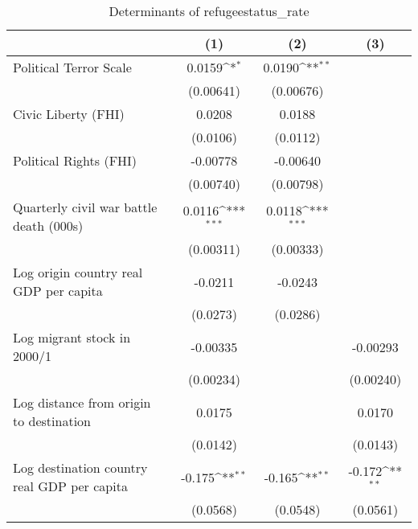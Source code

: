 \begin{table}[htbp]\centering
\def\sym#1{\ifmmode^{#1}\else\(^{#1}\)\fi}
\caption{Determinants of refugeestatus\_rate}
\begin{tabular}{l*{3}{c}}
\hline\hline
                    &\multicolumn{1}{c}{(1)}         &\multicolumn{1}{c}{(2)}         &\multicolumn{1}{c}{(3)}         \\
\hline
Political Terror Scale&      0.0159\sym{*}  &      0.0190\sym{**} &                     \\
                    &   (0.00641)         &   (0.00676)         &                     \\
[1em]
Civic Liberty (FHI) &      0.0208         &      0.0188         &                     \\
                    &    (0.0106)         &    (0.0112)         &                     \\
[1em]
Political Rights (FHI)&    -0.00778         &    -0.00640         &                     \\
                    &   (0.00740)         &   (0.00798)         &                     \\
[1em]
Quarterly civil war battle death (000s)&      0.0116\sym{***}&      0.0118\sym{***}&                     \\
                    &   (0.00311)         &   (0.00333)         &                     \\
[1em]
Log origin country real GDP per capita&     -0.0211         &     -0.0243         &                     \\
                    &    (0.0273)         &    (0.0286)         &                     \\
[1em]
Log migrant stock in 2000/1&    -0.00335         &                     &    -0.00293         \\
                    &   (0.00234)         &                     &   (0.00240)         \\
[1em]
Log distance from origin to destination&      0.0175         &                     &      0.0170         \\
                    &    (0.0142)         &                     &    (0.0143)         \\
[1em]
Log destination country real GDP per capita&      -0.175\sym{**} &      -0.165\sym{**} &      -0.172\sym{**} \\
                    &    (0.0568)         &    (0.0548)         &    (0.0561)         \\

\end{tabular}
\end{table}
